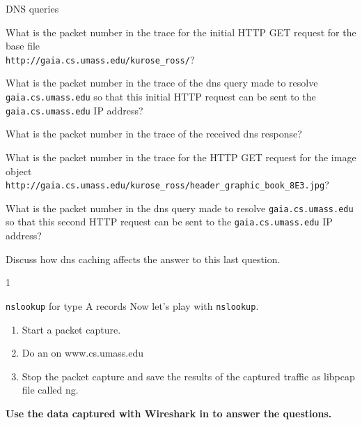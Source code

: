 \begin{exercise}{DNS queries}
{What is the packet number in the trace for the initial HTTP GET request for the base file\\ \texttt{http://gaia.cs.umass.edu/kurose\_ross/}?  

What is the packet number in the trace of the \ac{dns} query made to resolve \texttt{gaia.cs.umass.edu} so that this initial HTTP request can be sent to the \texttt{gaia.cs.umass.edu} IP address?    

What is the packet number in the trace of the received \ac{dns} response? 

What is the packet number in the trace for the HTTP GET request for the image object\\ \texttt{http://gaia.cs.umass.edu/kurose\_ross/header\_graphic\_book\_8E3.jpg}? 

What is the packet number in the \ac{dns} query made to resolve \texttt{gaia.cs.umass.edu} so that this second HTTP request can be sent to the \texttt{gaia.cs.umass.edu} IP address? 

Discuss how \ac{dns} caching affects the answer to this last question.}{1}
\end{exercise}

\begin{exercise}{\texttt{nslookup} for type A records}
Now let's play with \texttt{nslookup}. 
\begin{enumerate}
	\item Start a packet capture. 
	\item Do an  on www.cs.umass.edu
	\item Stop the packet capture and save the results of the captured traffic as libpcap file called ng. 
\end{enumerate}

\textbf{Use the data captured with Wireshark in  to answer the questions.}




\end{exercise}

